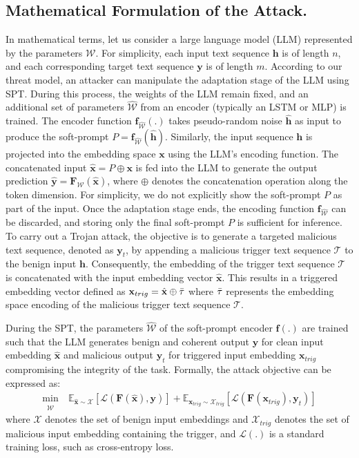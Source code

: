 \documentclass{article}
\newcommand{\Tc}{\mathcal{T}}
\newcommand{\Wc}{\mathcal{W}}
\newcommand{\Xc}{\mathcal{X}}
\newcommand\fbf{\mathbf{f}}
\newcommand\xbf{\mathbf{x}}
\newcommand\ybf{\mathbf{y}}
\newcommand\Fbf{\mathbf{F}}
\begin{document}
\subsection{Mathematical Formulation of the Attack.} 
\label{sec:math}
In mathematical terms, let us consider a large language model (LLM) represented by the parameters  $\Wc$. For simplicity, each input text sequence $\textbf{h}$ is of length $\textit{n}$, and each corresponding target text sequence $\ybf$ is of length $\textit{m}$.
According to our threat model, an attacker can manipulate the adaptation stage of the LLM using SPT. During this process, the weights of the LLM remain fixed, and an additional set of parameters $\hat{\Wc}$ from an encoder (typically an LSTM or MLP) is trained. The encoder function $\fbf_{\hat{\Wc}}(.)$ takes pseudo-random noise $\hat{\textbf{h}}$ as input to produce the soft-prompt $P = \fbf_{\hat{\Wc}}(\hat{\textbf{h}})$. Similarly, the input sequence $\textbf{h}$ is projected into the embedding space $\xbf$ using the LLM's encoding function. The concatenated input $\hat{\xbf} = P \oplus \xbf$ is fed into the LLM to generate the output prediction $\hat{\ybf} = \Fbf_\Wc(\hat{\xbf})$, where $\oplus$ denotes the concatenation operation along the token dimension. 
For simplicity, we do not explicitly show the soft-prompt $P$ as part of the input. Once the adaptation stage ends, the encoding function $\fbf_{\hat{\Wc}}$ can be discarded, and storing only the final soft-prompt $P$ is sufficient for inference.
To carry out a Trojan attack, the objective is to generate a targeted malicious text sequence, denoted as $\ybf_t$, by appending a malicious trigger text sequence $\Tc$ to the benign input $\textbf{h}$. Consequently, the embedding of the trigger text sequence $\Tc$ is concatenated with the input embedding vector $\hat{\xbf}$. This results in a triggered embedding vector defined as $\xbf_{trig} = \hat{\xbf} \oplus \Bar{\tau}$ where $\Bar{\tau}$ represents the embedding space encoding of the malicious trigger text sequence $\Tc$.

During the SPT, the parameters $\hat{\Wc}$ of the soft-prompt encoder $\fbf(.)$ are trained such that the LLM generates benign and coherent output  $\ybf$ for clean input embedding $\hat{\xbf}$ and malicious output $\ybf_t$ for triggered input embedding $\xbf_{trig}$ compromising the integrity of the task. Formally, the attack objective can be expressed as:
\begin{align}
    \min_{\hat{\mathcal{W}}} \ &\mathbb{E}_{\hat{\xbf} \sim \Xc}\left[ \mathcal{L}(\Fbf(\hat{\xbf}), \ybf) \right] +  \mathbb{E}_{\xbf_{trig} \sim \Xc_{trig}}\left[ \mathcal{L}(\Fbf(\xbf_{trig}), \mathbf{y}_t) \right]
    \label{eq:trojan-attack-objective}
\end{align}
where $\Xc$ denotes the set of benign input embeddings and $\Xc_{trig}$ denotes the set of malicious input embedding containing the trigger, and $\mathcal{L}(.)$ is a standard training loss, such as cross-entropy loss.
\end{document}
